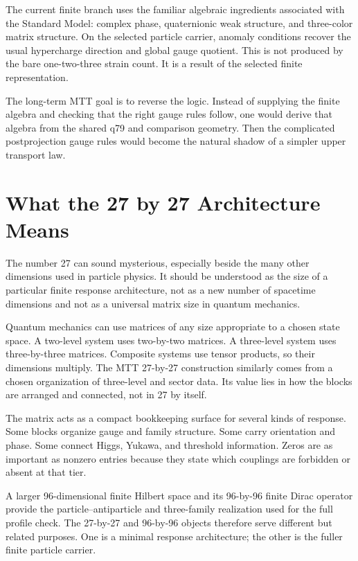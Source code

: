\documentclass[11pt,openany]{book}
\begin{document}
The current finite branch uses the familiar algebraic ingredients associated
with the Standard Model: complex phase, quaternionic weak structure, and
three-color matrix structure. On the selected particle carrier, anomaly
conditions recover the usual hypercharge direction and global gauge quotient.
This is not produced by the bare one-two-three strain count. It is a result
of the selected finite representation.

The long-term MTT goal is to reverse the logic. Instead of supplying the
finite algebra and checking that the right gauge rules follow, one would
derive that algebra from the shared q79 and comparison geometry. Then the
complicated postprojection gauge rules would become the natural shadow of a
simpler upper transport law.

\chapter{What the 27 by 27 Architecture Means}

The number 27 can sound mysterious, especially beside the many other
dimensions used in particle physics. It should be understood as the size of a
particular finite response architecture, not as a new number of spacetime
dimensions and not as a universal matrix size in quantum mechanics.

Quantum mechanics can use matrices of any size appropriate to a chosen state
space. A two-level system uses two-by-two matrices. A three-level system uses
three-by-three matrices. Composite systems use tensor products, so their
dimensions multiply. The MTT 27-by-27 construction similarly comes from a
chosen organization of three-level and sector data. Its value lies in how the
blocks are arranged and connected, not in 27 by itself.

The matrix acts as a compact bookkeeping surface for several kinds of
response. Some blocks organize gauge and family structure. Some carry
orientation and phase. Some connect Higgs, Yukawa, and threshold information.
Zeros are as important as nonzero entries because they state which couplings
are forbidden or absent at that tier.

A larger 96-dimensional finite Hilbert space and its 96-by-96 finite Dirac
operator provide the particle--antiparticle and three-family realization used
for the full profile check. The 27-by-27 and 96-by-96 objects therefore serve
different but related purposes. One is a minimal response architecture; the
other is the fuller finite particle carrier.
\end{document}
